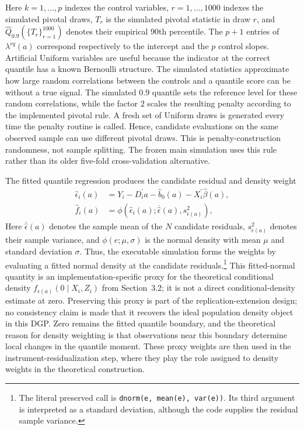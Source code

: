 Here $k=1,\ldots,p$ indexes the control variables, $r=1,\ldots,1000$ indexes the simulated pivotal draws, $T_r$ is the simulated pivotal statistic in draw $r$, and $\widehat Q_{0.9}(\{T_r\}_{r=1}^{1000})$ denotes their empirical 90th percentile. The $p+1$ entries of $\lambda^{rq}(a)$ correspond respectively to the intercept and the $p$ control slopes. Artificial Uniform variables are useful because the indicator at the correct quantile has a known Bernoulli structure. The simulated statistics approximate how large random correlations between the controls and a quantile score can be without a true signal. The simulated $0.9$ quantile sets the reference level for these random correlations, while the factor $2$ scales the resulting penalty according to the implemented pivotal rule. A fresh set of Uniform draws is generated every time the penalty routine is called. Hence, candidate evaluations on the same observed sample can use different pivotal draws. This is penalty-construction randomness, not sample splitting. The frozen main simulation uses this rule rather than its older five-fold cross-validation alternative.

The fitted quantile regression produces the candidate residual and density weight
\begin{equation}
    \begin{aligned}
        \widehat{\epsilon}_i(a)
        &=
        Y_i-D_i^{\prime}a-\widehat b_0(a)
        -X_i^{\prime}\widehat{\beta}(a),\\
        \widehat f_i(a)
        &=
        \phi\!\left(
            \widehat{\epsilon}_i(a);
            \overline{\widehat{\epsilon}}(a),
            s_{\widehat{\epsilon}(a)}^2
        \right),
    \end{aligned}
    \label{eq:estimated-profile-residual}
\end{equation}
Here $\overline{\widehat{\epsilon}}(a)$ denotes the sample mean of the $N$ candidate residuals, $s_{\widehat{\epsilon}(a)}^{2}$ denotes their sample variance, and $\phi(e;\mu,\sigma)$ is the normal density with mean $\mu$ and standard deviation $\sigma$. Thus, the executable simulation forms the weights by evaluating a fitted normal density at the candidate residuals.\footnote{The literal preserved call is \texttt{dnorm(e, mean(e), var(e))}. Its third argument is interpreted as a standard deviation, although the code supplies the residual sample variance.} This fitted-normal quantity is an implementation-specific proxy for the theoretical conditional density $f_{\epsilon(a)}(0\mid X_i,Z_i)$ from Section~3.2; it is not a direct conditional-density estimate at zero. Preserving this proxy is part of the replication-extension design; no consistency claim is made that it recovers the ideal population density object in this DGP. Zero remains the fitted quantile boundary, and the theoretical reason for density weighting is that observations near this boundary determine local changes in the quantile moment. These proxy weights are then used in the instrument-residualization step, where they play the role assigned to density weights in the theoretical construction.

